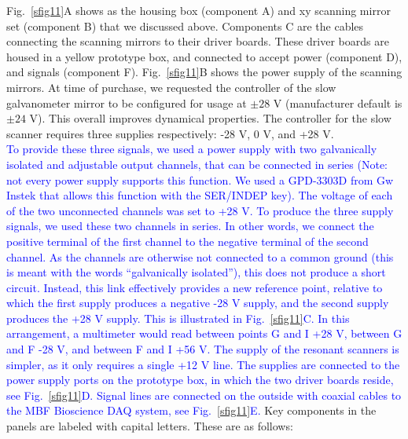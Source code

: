 \documentclass[10pt,letterpaper]{article}
\begin{document}
%
Fig.~\ref{sfig11}A shows as the housing box (component A) and xy scanning mirror set (component B) that we discussed above. Components C are the cables connecting the scanning mirrors to their driver boards. These driver boards are housed in a yellow prototype box, and connected to accept power (component D), and signals (component F). Fig.~\ref{sfig11}B shows the power supply of the scanning mirrors. At time of purchase, we requested the controller of the slow galvanometer mirror to be configured for usage at $\pm 28\text{ V}$ (manufacturer default is $\pm 24\text{ V}$). This overall improves dynamical properties. The controller for the slow scanner requires three supplies respectively: -28 V, 0 V, and +28 V. \\
\textcolor{blue}{To provide these three signals, we used a power supply with two galvanically isolated and adjustable output channels, that can be connected in series (Note: not every power supply supports this function. We used a GPD-3303D from Gw Instek that allows this function with the SER/INDEP key). The voltage of each of the two unconnected channels was set to +28 V. To produce the three supply signals, we used these two channels in series. In other words, we connect the positive terminal of the first channel to the negative terminal of the second channel. As the channels are otherwise not connected to a common ground (this is meant with the words ``galvanically isolated''), this does not produce a short circuit. Instead, this link effectively provides a new reference point, relative to which the first supply produces a negative -28 V supply, and the second supply produces the +28 V supply. This is illustrated in Fig.~\ref{sfig11}C. In this arrangement, a multimeter would read between points G and I +28 V, between G and F -28 V, and between F and I +56 V. The supply of the resonant scanners is simpler, as it only requires a single +12 V line. The supplies are connected to the power supply ports on the prototype box, in which the two driver boards reside, see Fig.~\ref{sfig11}D. Signal lines are connected on the outside with coaxial cables to the MBF Bioscience DAQ system, see Fig.~\ref{sfig11}E.} Key components in the panels are labeled with capital letters. These are as follows:
\end{document}
